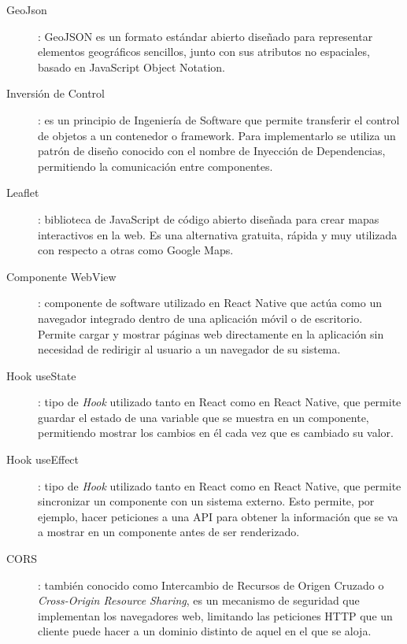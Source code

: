 \begin{description}
    \item[\hypertarget{geoJson}{GeoJson}]: GeoJSON es un formato estándar abierto diseñado para representar elementos geográficos sencillos, 
    junto con sus atributos no espaciales, basado en JavaScript Object Notation.

    \item[\hypertarget{inversionControl}{Inversión de Control}]: es un principio de Ingeniería de Software que permite transferir el control 
    de objetos a un contenedor o framework. Para implementarlo se utiliza un patrón de diseño conocido con el nombre de Inyección de Dependencias,
    permitiendo la comunicación entre componentes.

    \item[\hypertarget{leaflet}{Leaflet}]: biblioteca de JavaScript de código abierto diseñada para crear mapas interactivos en la web. Es una alternativa gratuita,
    rápida y muy utilizada con respecto a otras como Google Maps.

    \item[\hypertarget{webview}{Componente WebView}]: componente de software utilizado en React Native que actúa como un navegador integrado dentro de una aplicación
    móvil o de escritorio. Permite cargar y mostrar páginas web directamente en la aplicación sin necesidad de redirigir al usuario a un navegador de su sistema.

    \item[\hypertarget{useState}{Hook useState}]: tipo de \textit{Hook} utilizado tanto en React como en React Native, que permite guardar el estado de una variable 
    que se muestra en un componente, permitiendo mostrar los cambios en él cada vez que es cambiado su valor.

    \item[\hypertarget{useEffect}{Hook useEffect}]: tipo de \textit{Hook} utilizado tanto en React como en React Native, que permite sincronizar un componente con un
    sistema externo. Esto permite, por ejemplo, hacer peticiones a una API para obtener la información que se va a mostrar en un componente antes de ser renderizado.

    \item[\hypertarget{cors}{CORS}]: también conocido como Intercambio de Recursos de Origen Cruzado o \textit{Cross-Origin Resource Sharing}, es un mecanismo de seguridad
    que implementan los navegadores web, limitando las peticiones HTTP que un cliente puede hacer a un dominio distinto de aquel en el que se aloja.
\end{description}